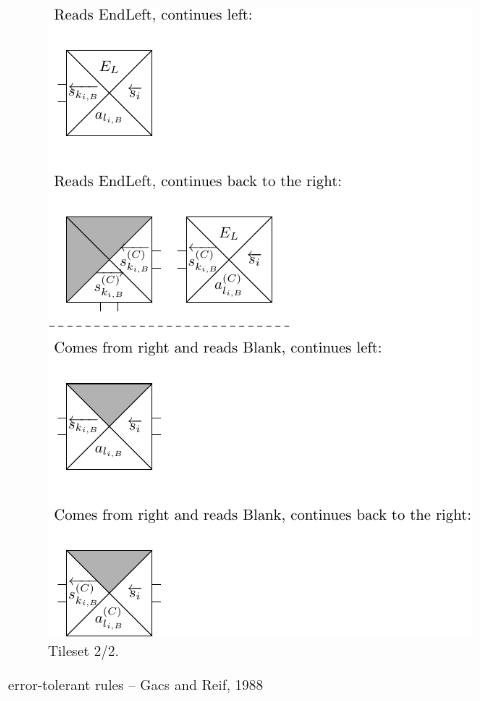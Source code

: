 		\begin{figure}[H]
		\begin{center}
			\includegraphics{./figures/tiles2.pdf}
			\caption{Tileset 2/2.}
		\end{center}
		\end{figure}
	
	
	error-tolerant rules -- Gacs and Reif, 1988\\
